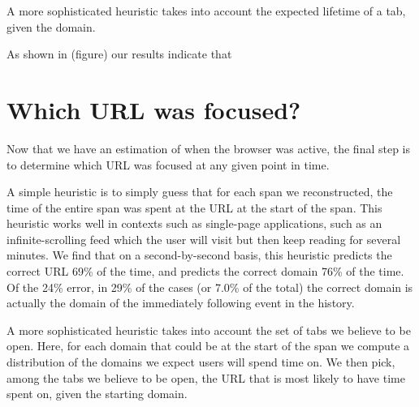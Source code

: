 \documentclass{sigchi}
\begin{document}
A more sophisticated heuristic takes into account the expected lifetime of a tab, given the domain.

As shown in (figure) our results indicate that 

\section{Which URL was focused?}

Now that we have an estimation of when the browser was active, the final step is to determine which URL was focused at any given point in time.

A simple heuristic is to simply guess that for each span we reconstructed, the time of the entire span was spent at the URL at the start of the span. This heuristic works well in contexts such as single-page applications, such as an infinite-scrolling feed which the user will visit but then keep reading for several minutes. We find that on a second-by-second basis, this heuristic predicts the correct URL 69\% of the time, and predicts the correct domain 76\% of the time. Of the 24\% error, in 29\% of the cases (or 7.0\% of the total) the correct domain is actually the domain of the immediately following event in the history.



A more sophisticated heuristic takes into account the set of tabs we believe to be open. Here, for each domain that could be at the start of the span we compute a distribution of the domains we expect users will spend time on. We then pick, among the tabs we believe to be open, the URL that is most likely to have time spent on, given the starting domain.
\end{document}
